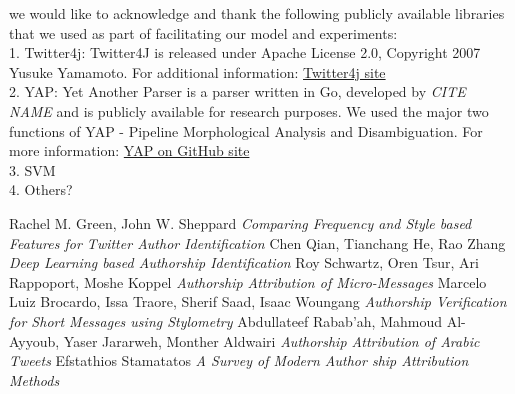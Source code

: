 \documentclass[a4paper]{article}
\begin{document}
we would like to acknowledge and thank the following publicly available libraries that we used as part of facilitating our model and experiments:\\
1. Twitter4j: Twitter4J is released under Apache License 2.0, Copyright 2007 Yusuke Yamamoto. For additional information: 
	\href{http://twitter4j.org/en/index.html}{Twitter4j site}\\
2. YAP: Yet Another Parser is a parser written in Go, developed by \emph{CITE NAME} and is publicly available for research purposes. We used the major two functions of YAP - Pipeline Morphological Analysis and Disambiguation. For more information: 
		\href{https://github.com/habeanf/yap}{YAP on GitHub site}\\
3. SVM\\
4. Others?\\ 

\begin{thebibliography}{9}

	Rachel M. Green, John W. Sheppard
	\textit{Comparing Frequency and Style based Features for Twitter Author Identification}
	Chen Qian, Tianchang He, Rao Zhang
	\textit{Deep Learning based Authorship Identification}
	Roy Schwartz, Oren Tsur, Ari Rappoport, Moshe Koppel
	\textit{Authorship Attribution of Micro-Messages}
	Marcelo Luiz Brocardo, Issa Traore, Sherif Saad, Isaac Woungang
	\textit{Authorship Verification for Short Messages using Stylometry}
	Abdullateef Rabab’ah, Mahmoud Al-Ayyoub, Yaser Jararweh, Monther Aldwairi
	\textit{Authorship Attribution of Arabic Tweets}
	Efstathios Stamatatos
	\textit{A Survey of Modern Author ship Attribution Methods}
	
\end{thebibliography}
\end{document}
